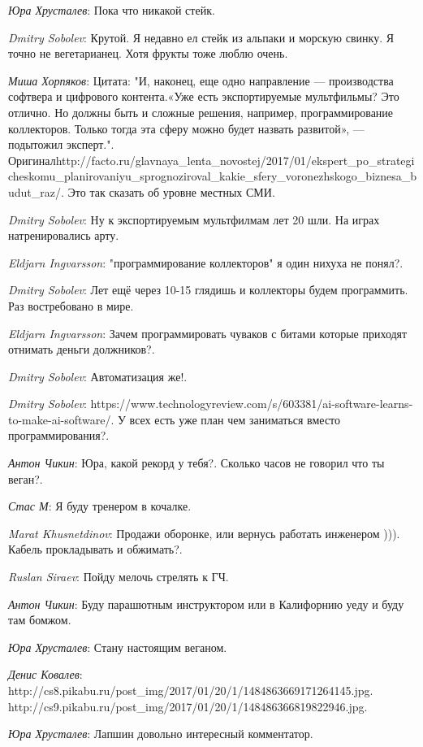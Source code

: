 \documentclass[10pt]{book}
\newcommand{\AUTHOR}[1]{\emph{#1}:}
\begin{document}
\AUTHOR{Юра Хрусталев} Пока что никакой стейк.

\AUTHOR{Dmitry Sobolev} Крутой. Я недавно ел стейк из альпаки и морскую свинку. Я точно не вегетарианец. Хотя фрукты тоже люблю очень.

\AUTHOR{Миша Хорпяков} Цитата: "И, наконец, еще одно направление — производства софтвера и цифрового контента.«Уже есть экспортируемые мультфильмы? Это отлично. Но должны быть и сложные решения, например, программирование коллекторов. Только тогда эта сферу можно будет назвать развитой», — подытожил эксперт.". Оригиналhttp://facto.ru/glavnaya_lenta_novostej/2017/01/ekspert_po_strategicheskomu_planirovaniyu_sprognoziroval_kakie_sfery_voronezhskogo_biznesa_budut_raz/. Это так сказать об уровне местных СМИ.

\AUTHOR{Dmitry Sobolev} Ну к экспортируемым мультфилмам лет 20 шли. На играх натренировались арту.

\AUTHOR{Eldjarn Ingvarsson} "программирование коллекторов" я один нихуха не понял?.

\AUTHOR{Dmitry Sobolev} Лет ещё через 10-15 глядишь и коллекторы будем программить. Раз востребовано в мире.

\AUTHOR{Eldjarn Ingvarsson} Зачем программировать чуваков с битами которые приходят отнимать деньги должников?.

\AUTHOR{Dmitry Sobolev} Автоматизация же!.

\AUTHOR{Dmitry Sobolev} https://www.technologyreview.com/s/603381/ai-software-learns-to-make-ai-software/. У всех есть уже план чем заниматься вместо программирования?.

\AUTHOR{Антон Чикин} Юра, какой рекорд у тебя?. Сколько часов не говорил что ты веган?.

\AUTHOR{Стас М} Я буду тренером в кочалке.

\AUTHOR{Marat Khusnetdinov} Продажи оборонке, или вернусь работать инженером ))). Кабель прокладывать и обжимать?.

\AUTHOR{Ruslan Siraev} Пойду мелочь стрелять к ГЧ.

\AUTHOR{Антон Чикин} Буду парашютным инструктором или в Калифорнию уеду и буду там бомжом.

\AUTHOR{Юра Хрусталев} Стану настоящим веганом.

\AUTHOR{Денис Ковалев} http://cs8.pikabu.ru/post_img/2017/01/20/1/1484863669171264145.jpg. http://cs9.pikabu.ru/post_img/2017/01/20/1/148486366819822946.jpg.

\AUTHOR{Юра Хрусталев} Лапшин довольно интересный комментатор.
\end{document}
